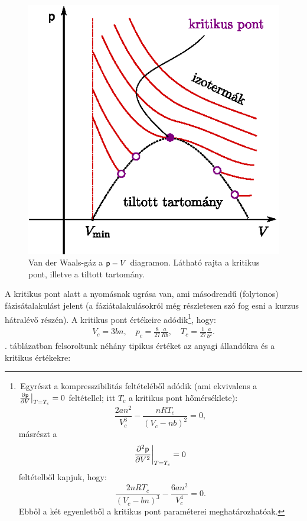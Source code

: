 \begin{figure}
    \centering
    \includegraphics{termo_4/termo_4_7.eps}
    \caption{Van der Waals-gáz a $\mathsf p-V$ diagramon. Látható rajta a kritikus pont, illetve a tiltott tartomány.}
    \label{fig:termo_4_7}
\end{figure}
A kritikus pont alatt a nyomásnak ugrása van, ami másodrendű (folytonos) fázisátalakulást jelent (a fáziátalakulásokról még részletesen szó fog esni a kurzus hátralévő részén). A kritikus pont értékeire adódik\footnote{\,Egyrészt a kompresszibilitás feltételéből adódik (ami ekvivalens a $\frac{\partial{\mathsf p}}{\partial{V}}\big|_{T=T_c}=0$ feltétellel; itt $T_c$ a kritikus pont hőmérséklete): $$ \frac{2an^2}{V_c^3}-\frac{nRT_c}{(V_c-nb)^2}=0,$$
másrészt a $$\frac{\partial^2\mathsf p}{\partial V^2}\bigg|_{T=T_c}=0$$ feltételből kapjuk, hogy:
$$\frac{2nRT_c}{(V_c-bn)^3}-\frac{6an^2}{V_c^4}=0.$$ Ebből a két egyenletből a kritikus pont paraméterei meghatározhatóak.}, hogy:
\begin{align}
    V_c = 3bn,\quad p_c = \frac{8}{27}\frac{a}{Rb},\quad T_c = \frac{1}{27}\frac{a}{b^2}.
\end{align}
. táblázatban felsoroltunk néhány tipikus értéket az anyagi állandókra és a kritikus értékekre:
